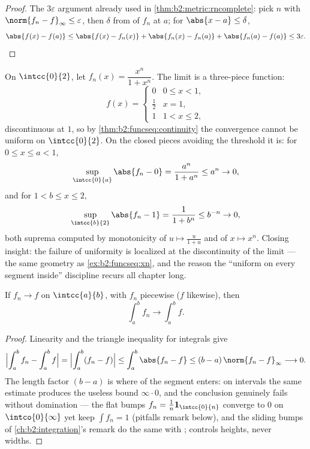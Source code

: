\begin{proof}
The $3\varepsilon$ argument already used in
\cref{thm:b2:metric:rncomplete}: pick $n$ with $\norm{f_n -
f}_\infty \leq \varepsilon$, then $\delta$ from  of
$f_n$ at $a$; for $\abs{x - a} \leq \delta$,
\[
\abs{f(x) - f(a)} \leq \abs{f(x) - f_n(x)} + \abs{f_n(x) - f_n(a)}
+ \abs{f_n(a) - f(a)} \leq 3\varepsilon . \qedhere
\]
\end{proof}

\begin{example}\label{ex:b2:funcseq:threshold}
On $\intcc{0}{2}$, let $f_n(x) = \dfrac{x^n}{1 + x^n}$. The
 limit is a three-piece function:
\[
f(x) = \begin{cases} 0 & 0 \leq x < 1,\\[2pt]
\tfrac12 & x = 1,\\[2pt]
1 & 1 < x \leq 2, \end{cases}
\]
discontinuous at $1$, so by \cref{thm:b2:funcseq:continuity}
the convergence cannot be uniform on $\intcc{0}{2}$. On the
closed pieces avoiding the threshold it is: for $0 \leq x \leq
a < 1$,
\[
\sup_{\intcc{0}{a}}\abs{f_n - 0}
= \frac{a^n}{1 + a^n} \leq a^n \to 0 ,
\]
and for $1 < b \leq x \leq 2$,
\[
\sup_{\intcc{b}{2}}\abs{f_n - 1}
= \frac{1}{1 + b^n} \leq b^{-n} \to 0 ,
\]
both suprema computed by monotonicity of $u \mapsto
\frac{u}{1+u}$ and of $x \mapsto x^n$. Closing insight: the
failure of uniformity is localized at the discontinuity of the
limit --- the same geometry as \cref{ex:b2:funcseq:xn}, and the
reason the ``uniform on every segment inside'' discipline
recurs all chapter long.
\end{example}

\begin{theorem}\label{thm:b2:funcseq:integration}
If $f_n \to f$  on $\intcc{a}{b}$, with $f_n$ piecewise
 ($f$ likewise), then
\[
\int_a^b f_n \longrightarrow \int_a^b f .
\]
\end{theorem}

\begin{proof}
Linearity and the triangle inequality for integrals give
\[
\Bigl|\int_a^b f_n - \int_a^b f\Bigr|
= \Bigl|\int_a^b (f_n - f)\Bigr|
\leq \int_a^b\abs{f_n - f}
\leq (b - a)\,\norm{f_n - f}_\infty \longrightarrow 0 .
\]
The length factor $(b - a)$ is where  of the segment
enters: on  intervals the same estimate produces the
useless bound $\infty\cdot0$, and the conclusion genuinely
fails without domination --- the flat bumps $f_n =
\frac1n\mathbf 1_{\intcc{0}{n}}$ converge  to $0$ on
$\intco{0}{\infty}$ yet keep $\int f_n = 1$ (pitfalls remark
below), and the sliding bumps of \cref{ch:b2:integration}'s
remark do the same with ;  controls heights, never widths.
\end{proof}


